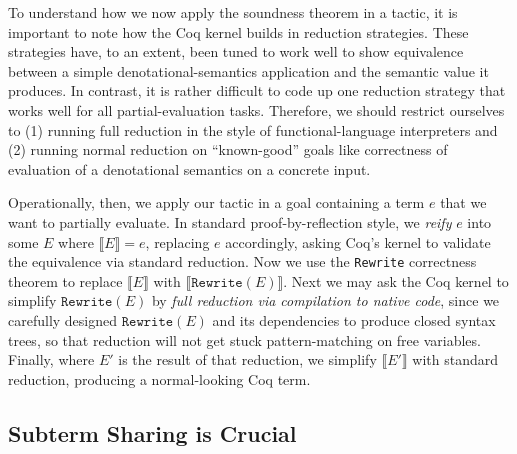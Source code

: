 To understand how we now apply the soundness theorem in a tactic, it is important to note how the Coq kernel builds in reduction strategies.
These strategies have, to an extent, been tuned to work well to show equivalence between a simple denotational-semantics application and the semantic value it produces.
In contrast, it is rather difficult to code up one reduction strategy that works well for all partial-evaluation tasks.
Therefore, we should restrict ourselves to (1) running full reduction in the style of functional-language interpreters and (2) running normal reduction on ``known-good'' goals like correctness of evaluation of a denotational semantics on a concrete input.

Operationally, then, we apply our tactic in a goal containing a term $e$ that we want to partially evaluate.
In standard proof-by-reflection style, we \emph{reify} $e$ into some $E$ where $\llbracket E \rrbracket = e$, replacing $e$ accordingly, asking Coq's kernel to validate the equivalence via standard reduction.
Now we use the \texttt{Rewrite} correctness theorem to replace $\llbracket E \rrbracket$ with $\llbracket \texttt{Rewrite}(E) \rrbracket$.
Next we may ask the Coq kernel to simplify $\texttt{Rewrite}(E)$ by \emph{full reduction via compilation to native code}, since we carefully designed $\texttt{Rewrite}(E)$ and its dependencies to produce closed syntax trees, so that reduction will not get stuck pattern-matching on free variables.
Finally, where $E'$ is the result of that reduction, we simplify $\llbracket E' \rrbracket$ with standard reduction, producing a normal-looking Coq term.


\subsection{Subterm Sharing is Crucial} \label{sec:under-lets}

